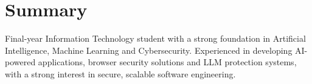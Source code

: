 \section{Summary}

Final-year Information Technology student with a strong foundation in Artificial Intelligence, Machine Learning and Cybersecurity. Experienced in developing AI-powered applications, browser security solutions and LLM protection systems, with a strong interest in secure, scalable software engineering.